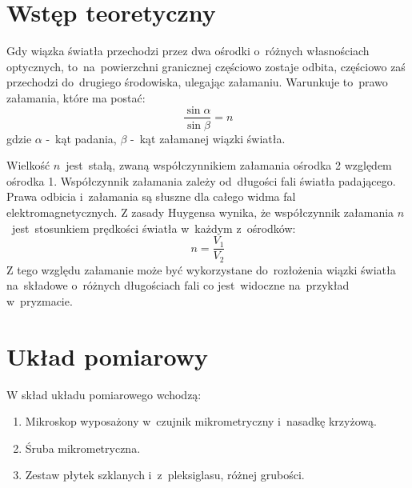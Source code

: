 \documentclass{fizraport}
\begin{document}
\maketitle
\section{Wstęp teoretyczny}
Gdy wiązka światła przechodzi przez dwa ośrodki o~różnych własnościach optycznych, to~na~powierzchni granicznej częściowo zostaje odbita, częściowo zaś przechodzi do~drugiego
środowiska, ulegając załamaniu. Warunkuje to~prawo załamania, które ma postać:
\begin{equation}
\frac{\sin\alpha}{\sin\beta}=n
\end{equation}
gdzie $\alpha$ -~kąt padania, $\beta$ -~kąt załamanej wiązki światła.

Wielkość $n$~jest~stałą, zwaną współczynnikiem załamania ośrodka 2 względem ośrodka 1. Współczynnik załamania zależy od~długości fali światła padającego.
Prawa odbicia i~załamania są słuszne dla całego widma fal elektromagnetycznych. Z zasady Huygensa wynika, że współczynnik załamania $n$~jest~stosunkiem prędkości światła w~każdym z~ośrodków:
\begin{equation}
n=\frac{V_1}{V_2}
\end{equation}
Z tego względu załamanie może być wykorzystane do~rozłożenia wiązki światła na~składowe o~różnych długościach fali co jest~widoczne na~przykład w~pryzmacie.

\newpage
\addtocounter{page}{2}

\section{Układ pomiarowy}
W skład układu pomiarowego wchodzą: 
\begin{enumerate}
    \item Mikroskop wyposażony w~czujnik mikrometryczny i~nasadkę krzyżową.
    \item Śruba mikrometryczna. 
    \item Zestaw płytek szklanych i~z~pleksiglasu, różnej grubości. 
\end{enumerate}


\end{document}
